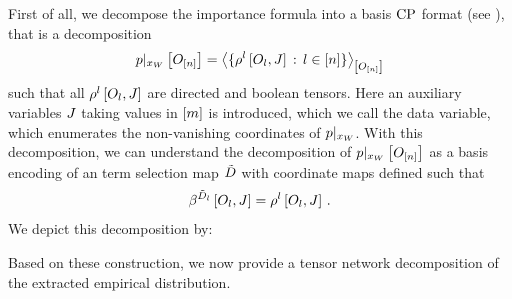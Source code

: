 First of all, we decompose the importance formula into a basis $\mathrm{CP}$ format (see ), that is a decomposition
\begin{align*}
    {p}|_{x_{W}} \left[O_{[n]}\right]
    = \left\langle 
        \{\rho^{l}\left[O_{l},J\right] \,:\, l\in[n] \}
    \right\rangle_{\left[ O_{[n]} \right]}
\end{align*}
such that all $\rho^{l}\left[O_{l},J\right]$ are directed and boolean tensors.
Here an auxiliary variables $J$ taking values in $[m]$ is introduced, which we call the data variable, which enumerates the non-vanishing coordinates of ${p}|_{x_{W}}$.
With this decomposition, we can understand the decomposition of ${p}|_{x_{W}} \left[O_{[n]}\right]$ as a basis encoding of an term selection map $\tilde{D}$ with coordinate maps defined such that
\begin{align*}
    \bencodingofat{\secdatamap_{\indenumerator}}{\indvariableof{\indenumerator},\datvariable}
    = \legcoreofat{\indenumerator}{\indvariableof{\indenumerator},\datvariable} \, .
\end{align*}
We depict this decomposition by:
\begin{center}
    
\end{center}

Based on these construction, we now provide a tensor network decomposition of the extracted empirical distribution.

